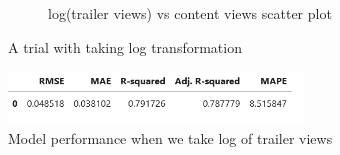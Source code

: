\documentclass[12pt,a4paper]{style}
\begin{document}
\begin{figure}[h]
\begin{subfigure}[t]{0.39\textwidth}
		\caption{log(trailer views) vs content views scatter plot}
		\label{fig:log_trailer}
	\end{subfigure}
	\caption{A trial with taking log transformation}
	\label{fig:}
\end{figure}
\begin{figure}[h]
	\centering
	\includegraphics[width=0.7\textwidth]{log_model_performance.png}
	\caption{Model performance when we take log of trailer views}
	\label{fig:log_performance}
\end{figure}
\end{document}
